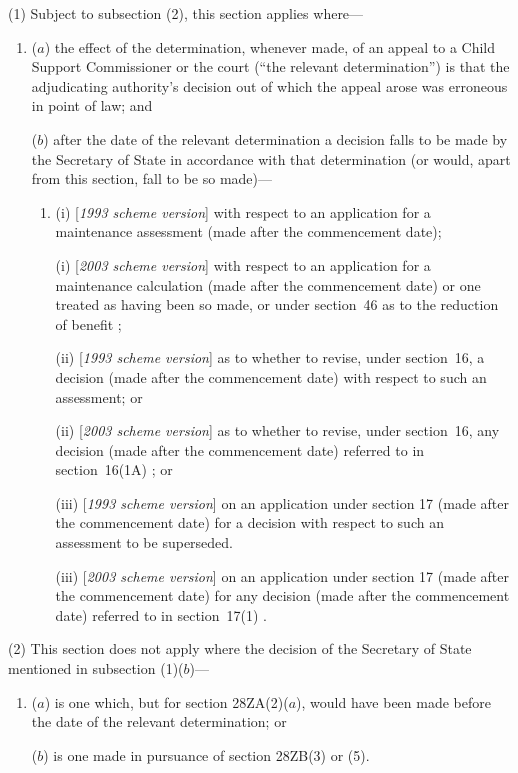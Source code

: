 \documentclass[12pt,a4paper]{article}
\begin{document}
(1) Subject to subsection (2), this section applies where—
\begin{enumerate}\item[]
($a$) the effect of the determination, whenever made, of an appeal to a Child Support Commissioner or the court (“the relevant determination”) is that the adjudicating authority’s decision out of which the appeal arose was erroneous in point of law; and

($b$) after the date of the relevant determination a decision falls to be made by the Secretary of State in accordance with that determination (or would, apart from this section, fall to be so made)—
\begin{enumerate}\item[]
(i) [\emph{1993 scheme version}] with respect to an application for a maintenance assessment (made after the commencement date);

(i) [\emph{2003 scheme version}] with respect to an application for a 
maintenance calculation  %
(made after the commencement date)
or one treated as having been so made, or under section~46 as to the reduction of benefit%
;

(ii) [\emph{1993 scheme version}] as to whether to revise, under section~16, a decision (made after the commencement date) with respect to such an assessment; or

(ii) [\emph{2003 scheme version}] as to whether to revise, under section~16, 
any decision (made after the commencement date) referred to in section~16(1A)%
; or

(iii) [\emph{1993 scheme version}] on an application under section 17 (made after the commencement date) for a decision with respect to such an assessment to be superseded.

(iii) [\emph{2003 scheme version}] on an application under section 17 (made after the commencement date) for 
any decision (made after the commencement date) referred to in section~17(1)%
.
\end{enumerate}
\end{enumerate}

(2) This section does not apply where the decision of the Secretary of State mentioned in subsection (1)($b$)—
\begin{enumerate}\item[]
($a$) is one which, but for section 28ZA(2)($a$), would have been made before the date of the relevant determination; or

($b$) is one made in pursuance of section 28ZB(3) or (5).
\end{enumerate}
\end{document}
